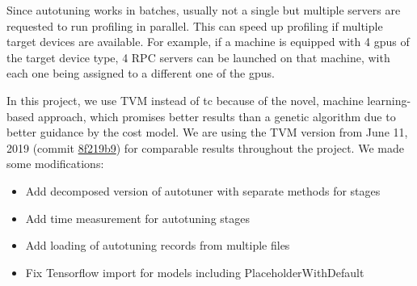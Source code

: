 Since autotuning works in batches, usually not a single but multiple servers are requested to run profiling in parallel. This can speed up profiling if multiple target devices are available. For example, if a machine is equipped with 4 \glspl{gpu} of the target device type, 4 RPC servers can be launched on that machine, with each one being assigned to a different one of the \glspl{gpu}.

In this project, we use TVM instead of \gls{tc} because of the novel, machine learning-based approach, which promises better results than a genetic algorithm due to better guidance by the cost model. We are using the TVM version from June 11, 2019 (commit \href{https://github.com/dmlc/tvm/tree/8f219b9}{8f219b9}) for comparable results throughout the project. We made some modifications:
\begin{itemize}
	\item Add decomposed version of autotuner with separate methods for stages
	\item Add time measurement for autotuning stages
	\item Add loading of autotuning records from multiple files
	\item Fix Tensorflow import for models including PlaceholderWithDefault
\end{itemize}
